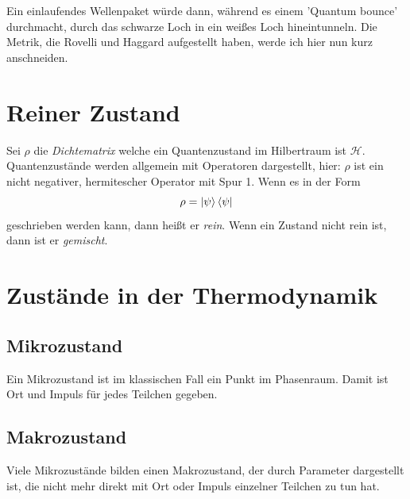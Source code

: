 \documentclass[ngerman]{scrartcl}
\newcommand{\Hil}{\mathcal{H}}
\begin{document}
Ein einlaufendes Wellenpaket würde dann, während es einem 'Quantum bounce' durchmacht, durch das schwarze Loch in ein weißes Loch hineintunneln. Die Metrik, die Rovelli und Haggard \cite{LQGRovelli} aufgestellt haben, werde ich hier nun kurz anschneiden.



\appendix
\section{Reiner Zustand} \label{ReinerZustandA}
Sei $\rho$ die \textit{Dichtematrix} welche ein Quantenzustand im Hilbertraum ist $\Hil$. Quantenzustände werden allgemein mit Operatoren dargestellt, hier: $\rho$ ist ein nicht negativer, hermitescher Operator mit Spur 1. Wenn es in der Form
	\begin{equation}
		\rho=\ket{\psi} \bra{\psi}
	\end{equation}
geschrieben werden kann, dann heißt er \textit{rein}. Wenn ein Zustand nicht rein ist, dann ist er \textit{gemischt}.

\section{Zustände in der Thermodynamik}

\subsection*{Mikrozustand}
Ein Mikrozustand ist im klassischen Fall ein Punkt im Phasenraum. Damit ist Ort und Impuls für jedes Teilchen gegeben.

\subsection*{Makrozustand}
Viele Mikrozustände bilden einen Makrozustand, der durch Parameter dargestellt ist, die nicht mehr direkt mit Ort oder Impuls einzelner Teilchen zu tun hat. 


\newpage
\printbibliography
\end{document}
